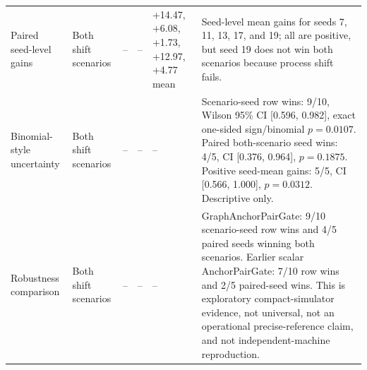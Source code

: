 \begin{table}[t]
{\begin{tabular}{p{3.4cm} p{3.2cm} r r p{3.2cm} p{7.0cm}}
Paired seed-level gains & Both shift scenarios & -- & -- & +14.47, +6.08, +1.73, +12.97, +4.77 mean & Seed-level mean gains for seeds 7, 11, 13, 17, and 19; all are positive, but seed 19 does not win both scenarios because process shift fails. \\
Binomial-style uncertainty & Both shift scenarios & -- & -- & -- & Scenario-seed row wins: 9/10, Wilson 95\% CI [0.596, 0.982], exact one-sided sign/binomial \(p=0.0107\). Paired both-scenario seed wins: 4/5, CI [0.376, 0.964], \(p=0.1875\). Positive seed-mean gains: 5/5, CI [0.566, 1.000], \(p=0.0312\). Descriptive only. \\
Robustness comparison & Both shift scenarios & -- & -- & -- & GraphAnchorPairGate: 9/10 scenario-seed row wins and 4/5 paired seeds winning both scenarios. Earlier scalar AnchorPairGate: 7/10 row wins and 2/5 paired-seed wins. This is exploratory compact-simulator evidence, not universal, not an operational precise-reference claim, and not independent-machine reproduction. \\
\bottomrule
\end{tabular}%
}
\end{table}